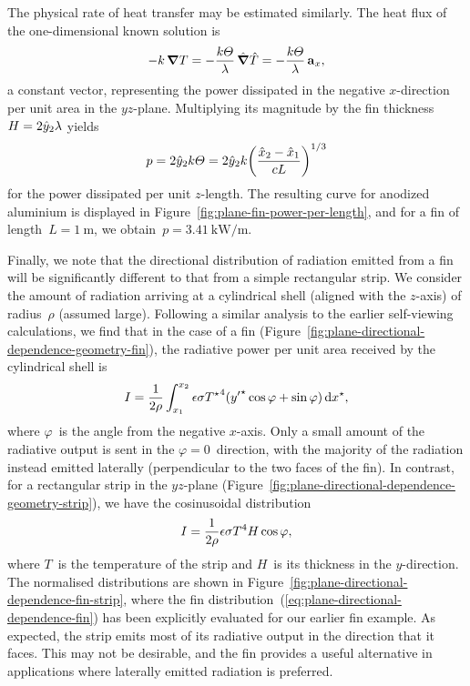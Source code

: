 The physical rate of heat transfer may be estimated similarly.
The heat flux of the one-dimensional known solution is
\begin{equation}
  {-k} \mathop{}\!\boldsymbol{\mathbf{\nabla}} T
    = -\frac{k \varTheta}{\lambda} \mathop{}\!\hat{\mathop{}\!\boldsymbol{\mathbf{\nabla}}}\hat{T}
    = -\frac{k \varTheta}{\lambda} \mathop{}\!\boldsymbol{\mathbf{a}}_{x},
  \label{eq:plane-heat-flux}
\end{equation}
a constant vector,
representing the power dissipated in the negative $x$-direction
per unit area in the $yz$-plane.
Multiplying its magnitude by the fin thickness~$H = 2 \hat{y}_2 \lambda$
yields
\begin{equation}
  p = 2 \scaled{y}_2 \conduc \Theta
    =
      2 \scaled{y}_2 \conduc
      \roundbr*{\frac{\scaled{x}_2 - \scaled{x}_1}{c L}}^{1/3}
  \label{eq:plane-fin-power-per-length}
\end{equation}
for the power dissipated per unit $z$-length.
The resulting curve for anodized aluminium
is displayed in Figure~\ref{fig:plane-fin-power-per-length},
and for a fin of length~$L = \SI{1}{\metre}$,
we obtain~$p = \SI{3.41}{\kilo\watt \per\metre}$.

Finally, we note that
the directional distribution of radiation emitted from a fin
will be significantly different
to that from a simple rectangular strip.
We consider the amount of radiation
arriving at a cylindrical shell (aligned with the $z$-axis)
of radius~$\rho$ (assumed large).
Following a similar analysis to the earlier self-viewing calculations,
we find that in the case of a fin
(Figure~\ref{fig:plane-directional-dependence-geometry-fin}),
the radiative power per unit area received by the cylindrical shell
is
\begin{equation}
  I =
    \frac{1}{2 \rho}
    \int_{x_1}^{x_2}
      \epsilon \sigma {T^\star}^4
      ({y'}^\star \cos\varphi + \sin\varphi)
    \mathop{}\!\mathrm{d} x^\star,
  \label{eq:plane-directional-dependence-fin}
\end{equation}
where $\varphi$~is the angle from the negative $x$-axis.
Only a small amount of the radiative output
is sent in the $\varphi = 0$~direction,
with the majority of the radiation instead emitted laterally
(perpendicular to the two faces of the fin).
In contrast,
for a rectangular strip in the $yz$-plane
(Figure~\ref{fig:plane-directional-dependence-geometry-strip}),
we have the cosinusoidal distribution
\begin{equation}
  I = \frac{1}{2 \rho} \epsilon \sigma T^4 H \cos\varphi,
  \label{eq:plane-directional-dependence-strip}
\end{equation}
where $T$~is the temperature of the strip
and $H$~is its thickness in the $y$-direction.
The normalised distributions are shown
in Figure~\ref{fig:plane-directional-dependence-fin-strip},
where the fin distribution~(\ref{eq:plane-directional-dependence-fin})
has been explicitly evaluated for our earlier fin example.
As expected,
the strip emits most of its radiative output in the direction that it faces.
This may not be desirable,
and the fin provides a useful alternative
in applications where laterally emitted radiation is preferred.

